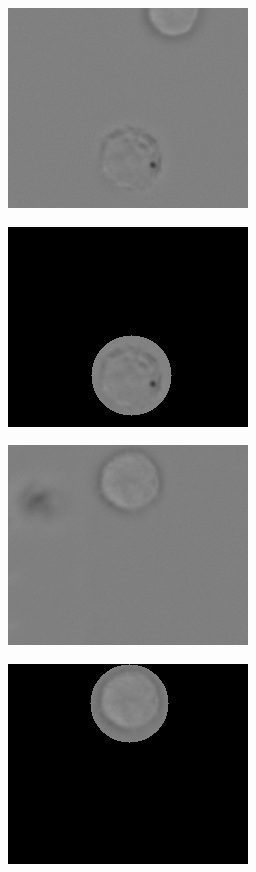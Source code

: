 \begin{figure}[h]
\begin{center}
		\begin{subfigure}[b]{0.45\textwidth}
		    \centering
			\includegraphics[height= 0.10\textheight]{thesis-template-master/images/hd1 (4550).png}
			\caption{}
			\label{fig:cellnet}
		\end{subfigure}
		\begin{subfigure}[b]{0.45\textwidth}
		    \centering
			\includegraphics[height= 0.10\textheight]{thesis-template-master/images/hd1 (4550) (1).png}
			\caption{}
			\label{fig:cellnet}
		\end{subfigure}
		\begin{subfigure}[b]{0.45\textwidth}
		    \centering
			\includegraphics[height= 0.10\textheight]{thesis-template-master/images/ss2_8 (142).png}
			\caption{}
			\label{fig:cellnet}
		\end{subfigure}
		\begin{subfigure}[b]{0.45\textwidth}
		    \centering
			\includegraphics[height= 0.10\textheight]{thesis-template-master/images/ss2_8 (142) (1).png}
			\caption{}
			\label{fig:cellnet}
		\end{subfigure}
		

\end{center}
\end{figure}
